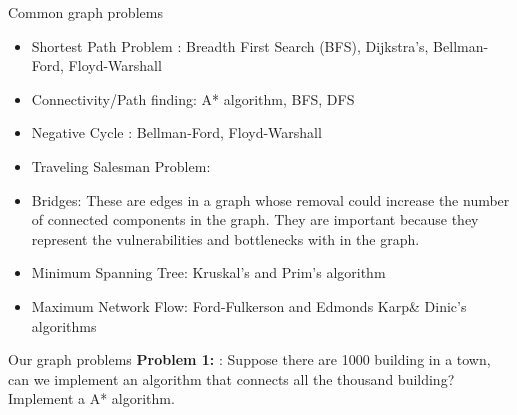 \documentclass[xcolor=dvipsnames]{beamer}
\begin{document}
\begin{frame}{Common graph problems}
	\begin{itemize}
		\item Shortest Path Problem : Breadth First Search (BFS), Dijkstra's, Bellman-Ford, Floyd-Warshall
		\item {\color{red} Connectivity/Path finding: A* algorithm}, BFS, DFS
		\item Negative Cycle : Bellman-Ford, Floyd-Warshall
		\item Traveling Salesman Problem: 
		\item Bridges: These are edges in a graph whose removal could increase the number of connected components in the graph. They are important because they represent the vulnerabilities and bottlenecks with in the graph.
		\item Minimum Spanning Tree: Kruskal's and Prim's algorithm
		\item Maximum Network Flow: Ford-Fulkerson and Edmonds Karp\& Dinic's algorithms

	\end{itemize}
\end{frame}

\begin{frame}{Our graph problems}
	\textbf{Problem 1: }: Suppose there are 1000 building in a town, can we implement an algorithm that connects all the thousand building? Implement a A* algorithm.

\end{frame}
\end{document}
